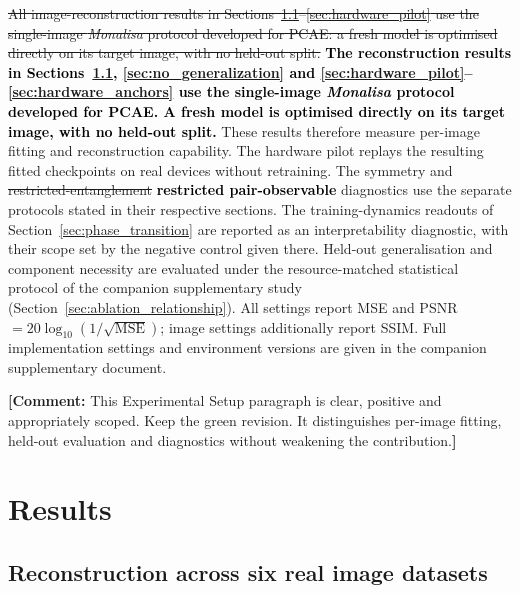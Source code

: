 \documentclass[pdflatex,sn-basic]{sn-jnl}
\newcommand{\del}[1]{\sout{#1}}
\newcommand{\add}[1]{\textbf{\textcolor{black}{#1}}}
\newcommand{\yellowcomment}[1]{%
  \par\smallskip\noindent
  \begingroup\setlength{\fboxsep}{3pt}%
  \colorbox{yellow!35}{\parbox{\dimexpr\linewidth-2\fboxsep\relax}{\textbf{[Comment:} #1\textbf{]}}}%
  \endgroup\par\smallskip}
\begin{document}
\color{green}
\del{All image-reconstruction results in
Sections~\ref{sec:sameset_results}--\ref{sec:hardware_pilot} use the single-image
\textit{Monalisa} protocol developed for PCAE: a fresh model is optimised directly
on its target image, with no held-out split.} \add{The reconstruction results in
Sections~\ref{sec:sameset_results}, \ref{sec:no_generalization} and
\ref{sec:hardware_pilot}--\ref{sec:hardware_anchors} use the single-image
\textit{Monalisa} protocol developed for PCAE. A fresh model is optimised
directly on its target image, with no held-out split.} These results therefore measure
per-image fitting and reconstruction capability. The hardware pilot replays the
resulting fitted checkpoints on real devices without retraining. The symmetry
and \del{restricted-entanglement} \add{restricted pair-observable} diagnostics use the separate protocols stated in
their respective sections. The training-dynamics
readouts of Section~\ref{sec:phase_transition} are reported as an
interpretability diagnostic, with their scope set by the negative control given
there. Held-out generalisation and component necessity are evaluated under the
resource-matched statistical protocol of the companion supplementary study
(Section~\ref{sec:ablation_relationship}). All settings report MSE and
PSNR $=20\log_{10}(1/\sqrt{\mathrm{MSE}})$; image settings
additionally report SSIM. Full implementation settings and environment versions
are given in the companion supplementary document.
\color{black}
\yellowcomment{This Experimental Setup paragraph is clear, positive and appropriately scoped. Keep the green revision. It distinguishes per-image fitting, held-out evaluation and diagnostics without weakening the contribution.}


\section{Results}
\label{sec:results}

\color{blue}
\subsection{Reconstruction across six real image datasets}
\label{sec:sameset_results}
\end{document}
